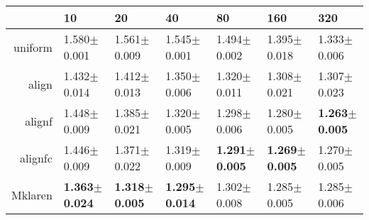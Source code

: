 \begin{table}[ht]
\centering
\begin{tabular}{rllllll}
  \hline
 & 10 & 20 & 40 & 80 & 160 & 320 \\ 
  \hline
uniform & 1.580$\pm$0.001 & 1.561$\pm$0.009 & 1.545$\pm$0.001 & 1.494$\pm$0.002 & 1.395$\pm$0.018 & 1.333$\pm$0.006 \\ 
  align & 1.432$\pm$0.014 & 1.412$\pm$0.013 & 1.350$\pm$0.006 & 1.320$\pm$0.011 & 1.308$\pm$0.021 & 1.307$\pm$0.023 \\ 
  alignf & 1.448$\pm$0.009 & 1.385$\pm$0.021 & 1.320$\pm$0.005 & 1.298$\pm$0.006 & 1.280$\pm$0.005 & \textbf{1.263$\pm$0.005} \\ 
  alignfc & 1.446$\pm$0.009 & 1.371$\pm$0.022 & 1.319$\pm$0.009 & \textbf{1.291$\pm$0.005} & \textbf{1.269$\pm$0.005} & 1.270$\pm$0.005 \\ 
  Mklaren & \textbf{1.363$\pm$0.024} & \textbf{1.318$\pm$0.005} & \textbf{1.295$\pm$0.014} & 1.302$\pm$0.008 & 1.285$\pm$0.005 & 1.285$\pm$0.006 \\ 
   \hline
\end{tabular}
\end{table}

